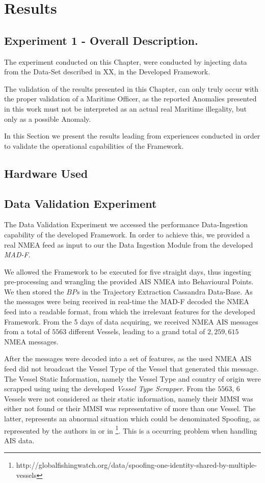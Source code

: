 \chapter{Results}
\label{chapter:Chapter 5}

\section{Experiment 1 - Overall Description.}
The experiment conducted on this Chapter, were conducted by injecting data from the Data-Set described in XX, in the Developed Framework.

The validation of the results presented in this Chapter, can only truly occur with the proper validation of a Maritime Officer, as the reported Anomalies presented in this work must not be interpreted as an actual real Maritime illegality, but only as a possible Anomaly. 

In this Section we present the results leading from experiences conducted in order to validate the operational capabilities of the Framework.

\section{Hardware Used}

\section{Data Validation Experiment}
\label{section: Experiment Data Val}
The Data Validation Experiment we accessed the performance Data-Ingestion capability of the developed Framework. In order to achieve this, we provided a real NMEA feed as input to our the Data Ingestion Module from the developed \emph{MAD-F}.

We allowed the Framework to be executed for five straight days, thus ingesting pre-processing and wrangling the provided AIS NMEA into Behavioural Points. We then stored the $BPs$ in the Trajectory Extraction Cassandra Data-Base.
As the messages were being received in real-time the MAD-F decoded the NMEA feed into a readable format, from which the irrelevant features for the developed Framework.
From the 5 days of data acquiring, we received NMEA AIS messages from a total of $5563$ different Vessels, leading to a grand total of $2,259,615$ NMEA messages.

After the messages were decoded into a set of features, as the used NMEA AIS feed did not broadcast the Vessel Type of the Vessel that generated this message. The Vessel Static Information, namely the Vessel Type and country of origin were scrapped using using the developed \emph{Vessel Type Scrapper}. From the $5563$, $6$ Vessels were not considered as their static information, namely their MMSI was either not found or their MMSI was representative of more than one Vessel. The latter, represents an abnormal situation which could be denominated Spoofing, as represented by the authors in \cite{Ray2015DeAISRisks} or in \footnote{http://globalfishingwatch.org/data/spoofing-one-identity-shared-by-multiple-vessels}. This is a occurring problem when handling AIS data. 


